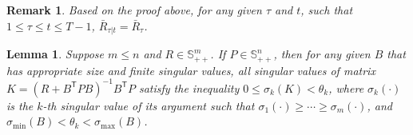 \documentclass[letterpaper, 10 pt, conference]{ieeeconf}  %
\newcommand{\transpose}{\mathsf{T}}
\newtheorem{lemma}{Lemma}
\newtheorem{remark}{Remark}
\begin{document}
\begin{remark}
    Based on the proof above, for any given $\tau$ and $t$, such that $1\leq \tau \leq t \leq T-1$, 
        $\bar{R}_{\tau|t} = \bar{R}_{\tau}$.
\end{remark}

\begin{lemma}\label{lemma:matrixK}
    Suppose $m \leq n$ and $R\in \mathbb{S}^{m}_{++}$. 
    If $P\in \mathbb{S}^{n}_{++}$, then for any given $B$ that has appropriate size and finite singular values, all singular values of matrix $K = (R+B^{\transpose}PB)^{-1}B^{\transpose}P$ satisfy the inequality
$  0 \leq \sigma_{k}(K) < \theta_{k}$,
    where $\sigma_{k}(\cdot)$ is the $k$-th singular value of its argument such that $\sigma_{1}(\cdot) \geq \cdots \geq \sigma_{m}(\cdot)$, and $\sigma_{\min}(B) < \theta_{k} <\sigma_{\max}(B)$.
\end{lemma}
\end{document}
